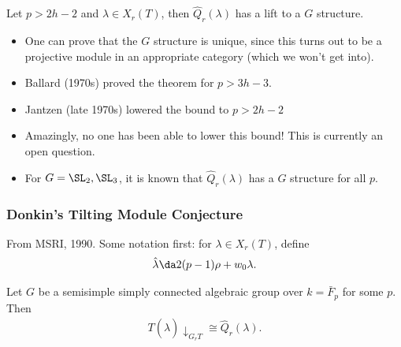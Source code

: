 \begin{theorem}[?]

Let \(p > 2h-2\) and \(\lambda \in X_r(T)\), then \(\hat{Q}_r(\lambda)\)
has a lift to a \(G\) structure.

\end{theorem}

\begin{remark}

\envlist

\begin{itemize}
\item
  One can prove that the \(G\) structure is unique, since this turns out
  to be a projective module in an appropriate category (which we won't
  get into).
\item
  Ballard (1970s) proved the theorem for \(p>3h-3\).
\item
  Jantzen (late 1970s) lowered the bound to \(p>2h-2\)
\item
  Amazingly, no one has been able to lower this bound! This is currently
  an open question.
\item
  For \(G = \SL_2, \SL_3\), it is known that \(\hat{Q}_r(\lambda)\) has
  a \(G\) structure for all \(p\).
\end{itemize}

\end{remark}

\hypertarget{donkins-tilting-module-conjecture}{%
\subsubsection{Donkin's Tilting Module
Conjecture}\label{donkins-tilting-module-conjecture}}

From MSRI, 1990. Some notation first: for \(\lambda \in X_r(T)\), define
\begin{align*}  
\hat{\lambda} \da 2(p-1) \rho + w_0 \lambda
.\end{align*}

\begin{conjecture}[?]

Let \(G\) be a semisimple simply connected algebraic group over
\(k = \bar{F}_p\) for some \(p\). Then
\begin{align*}  
T(\hat \lambda) \downarrow_{G_r T} \cong \hat{Q}_r(\lambda)
.\end{align*}

\end{conjecture}


